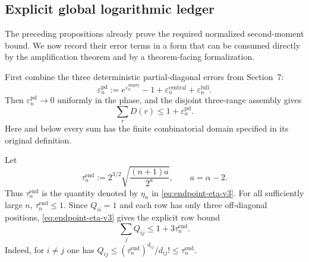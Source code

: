 
\subsection{Explicit global logarithmic ledger}
\label{subsec:explicit-global-ledger-v3}

The preceding propositions already prove the required normalized second-moment
bound. We now record their error terms in a form that can be consumed directly
by the amplification theorem and by a theorem-facing formalization.

First combine the three deterministic partial-diagonal errors from Section~7:
\begin{equation*}
  \varepsilon_n^{\mathrm{pd}}
  :=
  e^{\varepsilon_n^{\mathrm{empty}}}-1
  +\varepsilon_n^{\mathrm{central}}
  +\varepsilon_n^{\mathrm{full}}.
  \tag{9.31}
\end{equation*}
Then $\varepsilon_n^{\mathrm{pd}}\to0$ uniformly in the phase, and the disjoint
three-range assembly gives
\begin{equation*}
  \sum_rD(r)\le1+\varepsilon_n^{\mathrm{pd}}.
  \tag{9.32}
\end{equation*}
Here and below every sum has the finite combinatorial domain specified in its
original definition.

Let
\[
  \tau_n^{\mathrm{end}}
  :=2^{3/2}\sqrt{\frac{(n+1)a}{2^a}},
  \qquad a=\alpha-2.
\]
Thus $\tau_n^{\mathrm{end}}$ is the quantity denoted by $\eta_n$ in
\eqref{eq:endpoint-eta-v3}. For all sufficiently large $n$,
$\tau_n^{\mathrm{end}}\le1$. Since $Q_{ii}=1$ and each row has only three
off-diagonal positions, \eqref{eq:endpoint-eta-v3} gives the explicit row
bound
\begin{equation*}
  \sum_jQ_{ij}
  \le1+3\tau_n^{\mathrm{end}}.
  \tag{9.33}
\end{equation*}
Indeed, for $i\ne j$ one has
$Q_{ij}\le(\tau_n^{\mathrm{end}})^{d_{ij}}/d_{ij}!
\le\tau_n^{\mathrm{end}}$.

